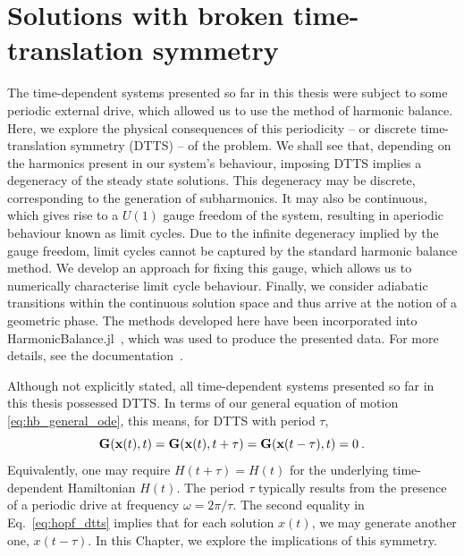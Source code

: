 

\chapter{Solutions with broken time-translation symmetry} \label{ch:hopf}


\begin{chapterabstract}
	
	
The time-dependent systems presented so far in this thesis were subject to some periodic external drive, which allowed us to use the method of harmonic balance. Here, we explore the physical consequences of this periodicity -- or discrete time-translation symmetry (DTTS) -- of the problem. We shall see that, depending on the harmonics present in our system's behaviour, imposing DTTS implies a degeneracy of the steady state solutions. This degeneracy may be discrete, corresponding to the generation of subharmonics. It may also be continuous, which gives rise to a $U(1)$ gauge freedom of the system, resulting in aperiodic behaviour known as limit cycles. Due to the infinite degeneracy implied by the gauge freedom, limit cycles cannot be captured by the standard harmonic balance method. We develop an approach for fixing this gauge, which allows us to numerically characterise limit cycle behaviour. Finally, we consider adiabatic transitions within the continuous solution space and thus arrive at the notion of a geometric phase.
%
\tcblower
%
The methods developed here have been incorporated into HarmonicBalance.jl~\cite{Kosata_2022a}, which was used to produce the presented data. For more details, see the documentation~\cite{harmonic_balance_docs}.
\end{chapterabstract}

Although not explicitly stated, all time-dependent systems presented so far in this thesis possessed DTTS. In terms of our general equation of motion \eqref{eq:hb_general_ode}, this means, for DTTS with period $\tau$,
\begin{equation} \label{eq:hopf_dtts}
\vb{G}(\vb{x}(t), t)=\vb{G}(\vb{x}(t), t+\tau)=\vb{G}(\vb{x}(t-\tau), t)=0\:.
\end{equation}
Equivalently, one may require $H(t + \tau) = H(t)$ for the underlying time-dependent Hamiltonian $H(t)$. The period $\tau$ typically results from the presence of a periodic drive at frequency $\omega = 2\pi / \tau$. The second equality in Eq.~\eqref{eq:hopf_dtts} implies that for each solution $x(t)$, we may generate another one, $x(t-\tau)$. In this Chapter, we explore the implications of this symmetry. 

